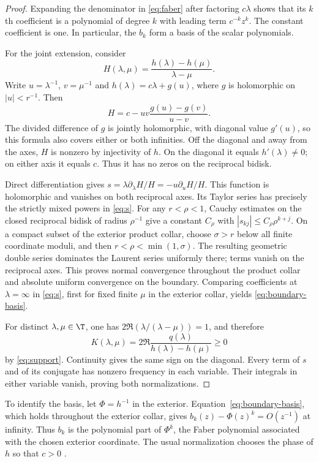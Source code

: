 \begin{proof}
Expanding the denominator in \eqref{eq:faber} after factoring $c\lambda$ shows that its $k$th coefficient is a polynomial of degree $k$ with leading term $c^{-k}z^k$. The constant coefficient is one. In particular, the $b_k$ form a basis of the scalar polynomials.

For the joint extension, consider
\[
 H(\lambda,\mu)=\frac{h(\lambda)-h(\mu)}{\lambda-\mu}.
\]
Write $u=\lambda^{-1}$, $v=\mu^{-1}$ and $h(\lambda)=c\lambda+g(u)$, where $g$ is holomorphic on $|u|<r^{-1}$. Then
\begin{equation}\label{eq:H}
 H=c-uv\frac{g(u)-g(v)}{u-v}.
\end{equation}
The divided difference of $g$ is jointly holomorphic, with diagonal value $g'(u)$, so this formula also covers either or both infinities. Off the diagonal and away from the axes, $H$ is nonzero by injectivity of $h$. On the diagonal it equals $h'(\lambda)\ne0$; on either axis it equals $c$. Thus it has no zeros on the reciprocal bidisk.

Direct differentiation gives $s=\lambda\partial_\lambda H/H=-u\partial_uH/H$. This function is holomorphic and vanishes on both reciprocal axes. Its Taylor series has precisely the strictly mixed powers in \eqref{eq:s}. For any $r<\rho<1$, Cauchy estimates on the closed reciprocal bidisk
of radius $\rho^{-1}$ give a constant $C_\rho$ with
$|s_{kj}|\le C_\rho\rho^{k+j}$. On a compact subset of the exterior
product collar, choose $\sigma>r$ below all finite coordinate moduli,
and then $r<\rho<\min(1,\sigma)$. The resulting geometric double
series dominates the Laurent series uniformly there; terms vanish on
the reciprocal axes. This proves normal convergence throughout the
product collar and absolute uniform convergence on the boundary. Comparing coefficients at $\lambda=\infty$ in \eqref{eq:s}, first for fixed finite $\mu$ in the exterior collar, yields \eqref{eq:boundary-basis}.

For distinct $\lambda,\mu\in\T$, one has $2\Re(\lambda/(\lambda-\mu))=1$, and therefore
\[
 K(\lambda,\mu)=2\Re\frac{q(\lambda)}{h(\lambda)-h(\mu)}\ge0
\]
by \eqref{eq:support}. Continuity gives the same sign on the diagonal. Every term of $s$ and of its conjugate has nonzero frequency in each variable. Their integrals in either variable vanish, proving both normalizations.
\end{proof}

To identify the basis, let $\Phi=h^{-1}$ in the exterior. Equation~\eqref{eq:boundary-basis}, which holds throughout the exterior collar, gives $b_k(z)-\Phi(z)^k=O(z^{-1})$ at infinity. Thus $b_k$ is the polynomial part of $\Phi^k$, the Faber polynomial associated with the chosen exterior coordinate. The usual normalization chooses the phase of $h$ so that $c>0$ \cite{Beckermann2005,BeckermannCrouzeix2014}.

